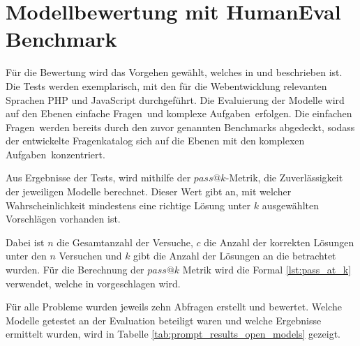 \section{Modellbewertung mit HumanEval Benchmark}
Für die Bewertung wird das Vorgehen gewählt, welches in \cite{chen-2021} und \cite{peng-2024} beschrieben ist. Die Tests werden exemplarisch, mit den für die Webentwicklung relevanten Sprachen PHP und JavaScript durchgeführt. Die Evaluierung der Modelle wird auf den Ebenen \glqq einfache Fragen\grqq \ und \glqq komplexe Aufgaben\grqq \ erfolgen. Die \glqq einfachen Fragen\grqq \ werden bereits durch den zuvor genannten Benchmarks abgedeckt, sodass der entwickelte Fragenkatalog sich auf die Ebenen mit den \glqq komplexen Aufgaben\grqq \ konzentriert.\vspace{0.2cm}

Aus Ergebnisse der Tests, wird mithilfe der $pass@k$-Metrik, die Zuverlässigkeit der jeweiligen Modelle berechnet. Dieser Wert gibt an, mit welcher Wahrscheinlichkeit mindestens eine richtige Lösung unter $k$ ausgewählten Vorschlägen vorhanden ist.\vspace{0.2cm}

Dabei ist $n$ die Gesamtanzahl der Versuche, $c$ die Anzahl der korrekten Lösungen unter den $n$ Versuchen und $k$ gibt die Anzahl der Lösungen an die betrachtet wurden. Für die Berechnung der $pass@k$ Metrik wird die Formal \ref{lst:pass_at_k} verwendet, welche in \cite{chen-2021} vorgeschlagen wird.\vspace{0.2cm}

Für alle Probleme wurden jeweils zehn Abfragen erstellt und bewertet. Welche Modelle getestet an der Evaluation beteiligt waren und welche Ergebnisse ermittelt wurden, wird in Tabelle \ref{tab:prompt_results_open_models} gezeigt.

